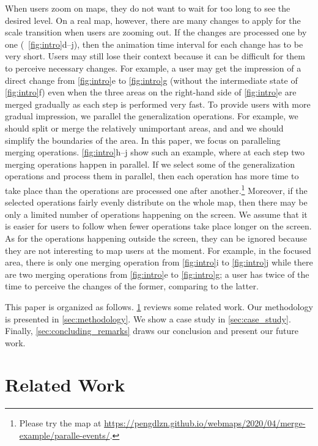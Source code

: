 \documentclass[ijgi,article,submit,moreauthors,pdftex]{Definitions/mdpi}
\begin{document}
When users zoom on maps, 
they do not want to wait for too long to see the desired level.
On a real map, however, 
there are many changes to apply for the scale transition 
when users are zooming out.
If the changes are processed one by one 
(\eg~\figs\ref{fig:intro}d--j),
then the animation time interval for each change has to be very short.
Users may still lose their context 
because it can be difficult for them to perceive necessary changes.
For example, a user may get the impression of
a direct change from \fig\ref{fig:intro}e to \fig\ref{fig:intro}g
(without the intermediate state of \fig\ref{fig:intro}f)
even when the three areas on the right-hand side of \fig\ref{fig:intro}e
are merged gradually as each step is performed very fast.
To provide users with more gradual impression, 
we parallel the generalization operations.
For example, we should split or merge the relatively unimportant areas,
and and we should simplify the boundaries of the area.
In this paper, we focus on paralleling merging operations.
\figs\ref{fig:intro}h--j show such an example,
where at each step two merging operations happen in parallel.
If we select some of the generalization operations
and process them in parallel,
then each operation has more time to take place 
than the operations are processed one after another.\footnote{%
Please try the map at
\url{https://pengdlzn.github.io/webmaps/2020/04/merge-example/paralle-events/}.}
Moreover, if the selected operations
fairly evenly distribute on the whole map, 
then there may be only a limited number of operations 
happening on the screen.
We assume that it is easier for users to follow 
when fewer operations take place longer on the screen.
As for the operations happening outside the screen,
they can be ignored because 
they are not interesting to map users at the moment.
For example, in the focused area, there is only one merging operation 
from \fig\ref{fig:intro}i to \fig\ref{fig:intro}j
while there are two merging operations  
from \fig\ref{fig:intro}e to \fig\ref{fig:intro}g;
a user has twice of the time to perceive the changes of the former,
comparing to the latter.

This paper is organized as follows.
\sect\ref{sec:realted_work} reviews some related work.
Our methodology is presented in \sect\ref{sec:methodology}.
We show a case study in \sect\ref{sec:case_study}.
Finally, \sect\ref{sec:concluding_remarks} draws our conclusion
and present our future work.



 
\section{Related Work}
\label{sec:realted_work}
\end{document}
